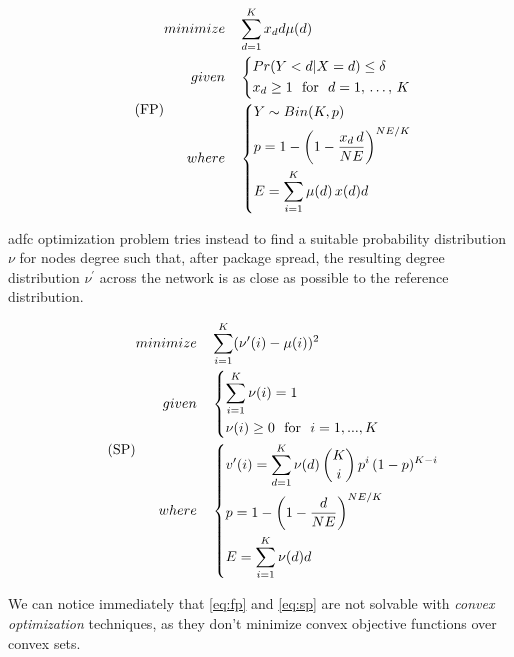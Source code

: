 \documentclass[12pt,journal,draftclsnofoot,onecolumn]{IEEEtran}
\begin{document}
\begin{equation}
	\label{eq:fp}
	\tag{FP}
	\begin{split}
		minimize \quad & \sum_{d=1}^K x_d d \mu (d) \\
		given \quad & \begin{dcases}
			Pr(Y<d|X=d) \leq \delta \\
			x_d \geq 1 \text{ ~for~ } d = 1, \, \ldots, \, K
		\end{dcases} \\
		where \quad & \begin{dcases}
			Y \sim Bin(K, p) \\
			p = 1 - \left( 1 - \frac{x_d \, d}{NE} \right) ^ {NE / K} \\
			E = \sum_{i = 1}^{K} \mu(d) \, x(d) d
		\end{dcases} \\
	\end{split}
\end{equation}

\bigbreak

\gls{adfc} optimization problem tries instead to find a suitable probability distribution $\nu$ for nodes degree such that, after package spread, the resulting degree distribution $\nu^\prime$ across the network is as close as possible to the reference distribution.

\begin{equation}
	\label{eq:sp}
	\tag{SP}
	\begin{split}
		minimize & \quad \sum_{i=1}^{K}(\nu'(i)-\mu(i))^2 \\
		given & \quad \begin{dcases}
			\sum_{i=1}^K \nu(i) = 1 \\
			\nu(i) \geq 0 \text{~~for~~} i=1,...,K
		\end{dcases} \\
		where & \quad
		\begin{dcases}
			v^\prime(i) = \sum_{d=1}^K \nu(d) \,\binom{K}{i} \, p^i \, (1-p)^{K-i} \\
			p = 1 - \left(1 -\frac{d}{N E}\right)^{{N E} / {K}} \\
			E = \sum_{i = 1}^{K} \nu(d) d
		\end{dcases}
	\end{split}
\end{equation} \vspace{0cm}

We can notice immediately that \autoref{eq:fp} and \autoref{eq:sp} are not solvable with \emph{convex optimization} techniques, as they don't minimize convex objective functions over convex sets.
\end{document}
